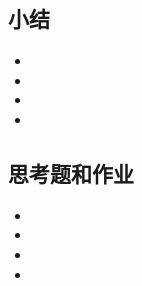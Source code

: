 \documentclass{article}
\begin{document}
\begin{CJK}{UTF8}{gkai}
\subsection{}

\subsection{小结}
\begin{itemize}
\item
\item
\item
\item 
\end{itemize}

\subsection{思考题和作业}
\begin{itemize}
\item
\item
\item
\item 
\end{itemize}



\end{CJK}
\end{document}
